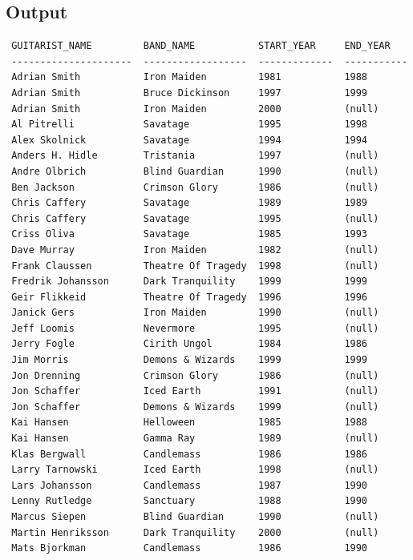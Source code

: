 \documentclass{report}
\begin{document}
\subsection*{Output}
\begin{verbatim}
 GUITARIST_NAME         BAND_NAME           START_YEAR     END_YEAR    
 ---------------------  ------------------  -------------  ----------- 
 Adrian Smith           Iron Maiden         1981           1988        
 Adrian Smith           Bruce Dickinson     1997           1999        
 Adrian Smith           Iron Maiden         2000           (null)      
 Al Pitrelli            Savatage            1995           1998        
 Alex Skolnick          Savatage            1994           1994        
 Anders H. Hidle        Tristania           1997           (null)      
 Andre Olbrich          Blind Guardian      1990           (null)      
 Ben Jackson            Crimson Glory       1986           (null)      
 Chris Caffery          Savatage            1989           1989        
 Chris Caffery          Savatage            1995           (null)      
 Criss Oliva            Savatage            1985           1993        
 Dave Murray            Iron Maiden         1982           (null)      
 Frank Claussen         Theatre Of Tragedy  1998           (null)      
 Fredrik Johansson      Dark Tranquility    1999           1999        
 Geir Flikkeid          Theatre Of Tragedy  1996           1996        
 Janick Gers            Iron Maiden         1990           (null)      
 Jeff Loomis            Nevermore           1995           (null)      
 Jerry Fogle            Cirith Ungol        1984           1986        
 Jim Morris             Demons & Wizards    1999           1999        
 Jon Drenning           Crimson Glory       1986           (null)      
 Jon Schaffer           Iced Earth          1991           (null)      
 Jon Schaffer           Demons & Wizards    1999           (null)      
 Kai Hansen             Helloween           1985           1988        
 Kai Hansen             Gamma Ray           1989           (null)      
 Klas Bergwall          Candlemass          1986           1986        
 Larry Tarnowski        Iced Earth          1998           (null)      
 Lars Johansson         Candlemass          1987           1990        
 Lenny Rutledge         Sanctuary           1988           1990        
 Marcus Siepen          Blind Guardian      1990           (null)      
 Martin Henriksson      Dark Tranquility    2000           (null)      
 Mats Bjorkman          Candlemass          1986           1990        

\end{verbatim}
\end{document}

